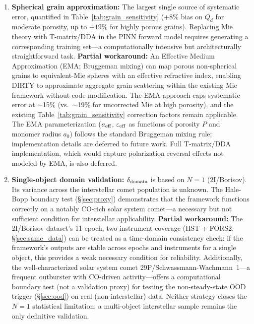 \documentclass[usenatbib]{mnras}
\begin{document}
\begin{enumerate}
    \item \textbf{Spherical grain approximation:} The largest single source of systematic error, quantified in Table~\ref{tab:grain_sensitivity} ($+8\%$ bias on $Q_d$ for moderate porosity, up to $+19\%$ for highly porous grains). Replacing Mie theory with T-matrix/DDA in the PINN forward model requires generating a corresponding training set---a computationally intensive but architecturally straightforward task. \textbf{Partial workaround:} An Effective Medium Approximation (EMA; Bruggeman mixing) can map porous non-spherical grains to equivalent-Mie spheres with an effective refractive index, enabling DIRTY to approximate aggregate grain scattering within the existing Mie framework without code modification. The EMA approach caps systematic error at $\sim$15\% (vs.\ $\sim$19\% for uncorrected Mie at high porosity), and the existing Table~\ref{tab:grain_sensitivity} correction factors remain applicable. The EMA parameterization ($a_{\rm eff}$, $\varepsilon_{\rm eff}$ as functions of porosity $P$ and monomer radius $a_0$) follows the standard Bruggeman mixing rule; implementation details are deferred to future work. Full T-matrix/DDA implementation, which would capture polarization reversal effects not modeled by EMA, is also deferred.
    \item \textbf{Single-object domain validation:} $\delta_{\rm domain}$ is based on $N=1$ (2I/Borisov). Its variance across the interstellar comet population is unknown. The Hale-Bopp boundary test (\S\ref{sec:proxy}) demonstrates that the framework functions correctly on a notably CO-rich solar system comet---a necessary but not sufficient condition for interstellar applicability. \textbf{Partial workaround:} The 2I/Borisov dataset's 11-epoch, two-instrument coverage (HST + FORS2; \S\ref{sec:same_data}) can be treated as a time-domain consistency check: if the framework's outputs are stable across epochs and instruments for a single object, this provides a weak necessary condition for reliability. Additionally, the well-characterized solar system comet 29P/Schwassmann-Wachmann~1---a frequent outburster with CO-driven activity---offers a computational boundary test (not a validation proxy) for testing the non-steady-state OOD trigger (\S\ref{sec:ood}) on real (non-interstellar) data. Neither strategy closes the $N=1$ statistical limitation; a multi-object interstellar sample remains the only definitive validation.

\end{enumerate}
\end{document}
